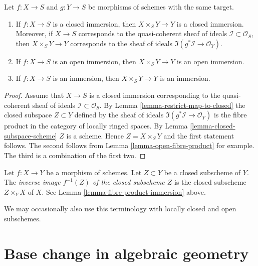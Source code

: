 \begin{lemma}
\label{lemma-fibre-product-immersion}
Let $f : X \to S$ and $g : Y \to S$ be morphisms of schemes
with the same target.
\begin{enumerate}
\item If $f : X \to S$ is a closed immersion,
then $X \times_S Y \to Y$ is a closed immersion.
Moreover, if $X \to S$ corresponds to the quasi-coherent
sheaf of ideals $\mathcal{I} \subset \mathcal{O}_S$, then
$X \times_S Y \to Y$ corresponds to the sheaf of ideals
$\Im(g^*\mathcal{I} \to \mathcal{O}_Y)$.
\item If $f : X \to S$ is an open immersion,
then $X \times_S Y \to Y$ is an open immersion.
\item If $f : X \to S$ is an immersion,
then $X \times_S Y \to Y$ is an immersion.
\end{enumerate}
\end{lemma}

\begin{proof}
Assume that $X \to S$ is a closed immersion corresponding
to the quasi-coherent sheaf of ideals $\mathcal{I} \subset \mathcal{O}_S$.
By Lemma \ref{lemma-restrict-map-to-closed} the closed subspace
$Z \subset Y$ defined by the sheaf of ideals
$\Im(g^*\mathcal{I} \to \mathcal{O}_Y)$ is the fibre product
in the category of locally ringed spaces.
By Lemma \ref{lemma-closed-subspace-scheme} $Z$ is a scheme.
Hence $Z = X \times_S Y$ and the first statement follows.
The second follows from Lemma \ref{lemma-open-fibre-product}
for example. The third is a combination of
the first two.
\end{proof}

\begin{definition}
\label{definition-inverse-image-closed-subscheme}
Let $f : X \to Y$ be a morphism of schemes. Let $Z \subset Y$ be a
closed subscheme of $Y$. The {\it inverse image $f^{-1}(Z)$ of the
closed subscheme $Z$} is the closed subscheme $Z \times_Y X$ of
$X$. See Lemma \ref{lemma-fibre-product-immersion} above.
\end{definition}

\noindent
We may occasionally also use this terminology with locally closed and
open subschemes.









\section{Base change in algebraic geometry}
\label{section-base-change}

